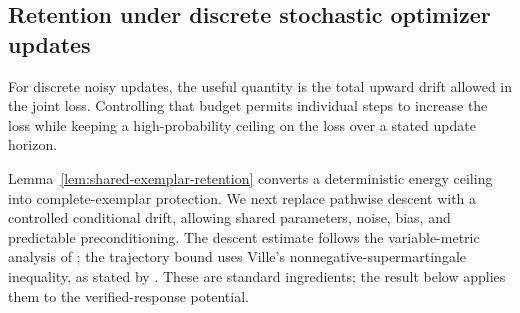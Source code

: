 \subsection{Retention under discrete stochastic optimizer updates}
\label{app:theory-optimizer}

For discrete noisy updates, the useful quantity is the total upward drift
allowed in the joint loss. Controlling that budget permits individual steps
to increase the loss while keeping a high-probability ceiling on the loss
over a stated update horizon.

Lemma~\ref{lem:shared-exemplar-retention} converts a deterministic energy
ceiling into complete-exemplar protection. We next replace pathwise descent
with a controlled conditional drift, allowing shared parameters, noise,
bias, and predictable preconditioning. The descent estimate follows the
variable-metric analysis of \citet[Section~2]{wang2017sqn}; the trajectory
bound uses Ville's nonnegative-supermartingale inequality, as stated by
\citet[Lemma~1]{howard2020timeuniform}. These are standard ingredients;
the result below applies them to the verified-response potential.

